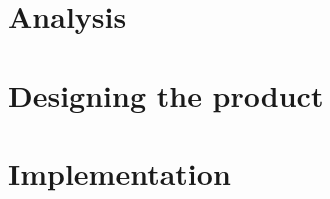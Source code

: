 




\newpage
\thispagestyle{empty}
\mbox{}



\setcounter{secnumdepth}{3}
\setcounter{tocdepth}{1}

\tableofcontents

\part{Analysis}












\part{Designing the product}















\part{Implementation}




